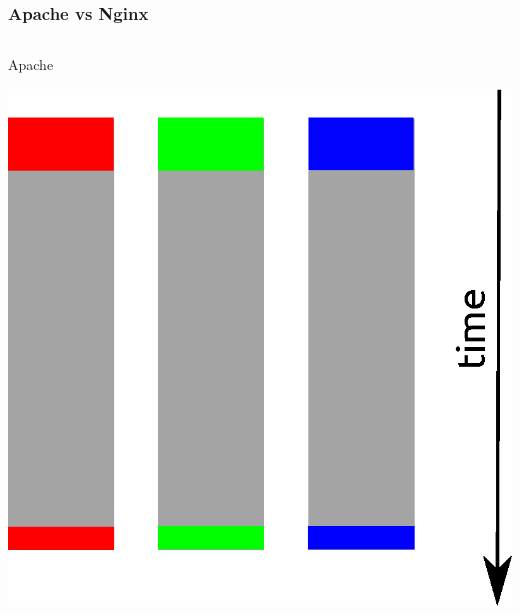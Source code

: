 \documentclass[aspectratio=169]{beamer}
\begin{document}
\begin{frame}
  \frametitle{Apache vs Nginx}
  \pause

  \begin{columns}
    \begin{column}{.45\textwidth}

      \begin{center}Apache\end{center}
      \begin{center}
        \includegraphics[scale=0.45]{img/part1_3_threads.eps}
      \end{center}

    \end{column}
    \hfill


\end{columns}
\end{frame}
\end{document}

